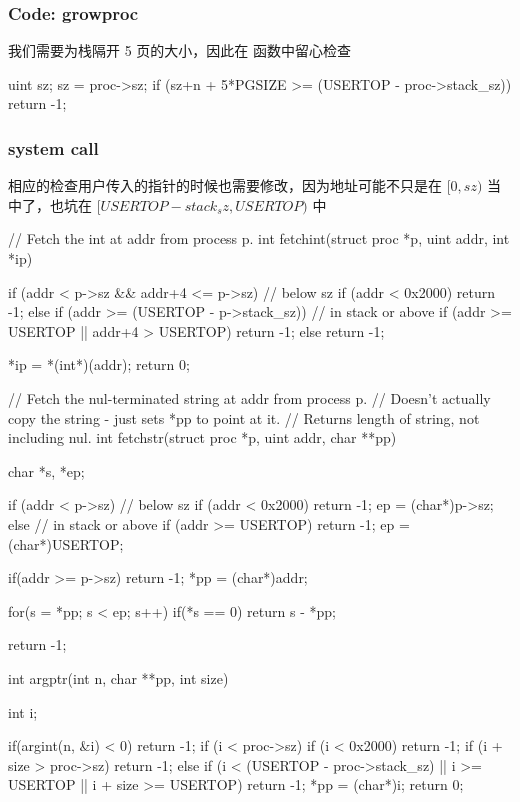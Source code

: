\subsubsection{Code: growproc}

我们需要为栈隔开 5 页的大小，因此在  函数中留心检查


\begin{ccode}
    uint sz;
    sz = proc->sz;
    if (sz+n + 5*PGSIZE >= (USERTOP - proc->stack_sz))
        return -1;
\end{ccode}

\subsubsection{system call}

相应的检查用户传入的指针的时候也需要修改，因为地址可能不只是在 $[0, sz)$ 当中了，也坑在 $[USERTOP-stack_sz, USERTOP)$ 中

\begin{ccode}
    // Fetch the int at addr from process p.
    int
    fetchint(struct proc *p, uint addr, int *ip)
    {
        if (addr < p->sz && addr+4 <= p->sz) { // below sz
            if (addr < 0x2000) return -1;
        } else if (addr >= (USERTOP - p->stack_sz)) { // in stack or above
            if (addr >= USERTOP || addr+4 > USERTOP) return -1;
        } else return -1;

        *ip = *(int*)(addr);
        return 0;
    }

    // Fetch the nul-terminated string at addr from process p.
    // Doesn't actually copy the string - just sets *pp to point at it.
    // Returns length of string, not including nul.
    int
    fetchstr(struct proc *p, uint addr, char **pp)
    {
        char *s, *ep;

        if (addr < p->sz) { // below sz
            if (addr < 0x2000) return -1;
            ep = (char*)p->sz;
        } else { // in stack or above
            if (addr >= USERTOP) return -1;
            ep = (char*)USERTOP;
        }

        if(addr >= p->sz)
            return -1;
        *pp = (char*)addr;
        
        for(s = *pp; s < ep; s++)
            if(*s == 0)
            return s - *pp;
        
        return -1;
    }
    int
    argptr(int n, char **pp, int size)
    {
        int i;
        
        if(argint(n, &i) < 0)
            return -1;
        if (i < proc->sz) {
            if (i < 0x2000) return -1;
            if (i + size > proc->sz) return -1;
        } else {
            if (i < (USERTOP - proc->stack_sz) || i >= USERTOP || i + size >= USERTOP) return -1;
        }
        *pp = (char*)i;
        return 0;
    }
\end{ccode}

